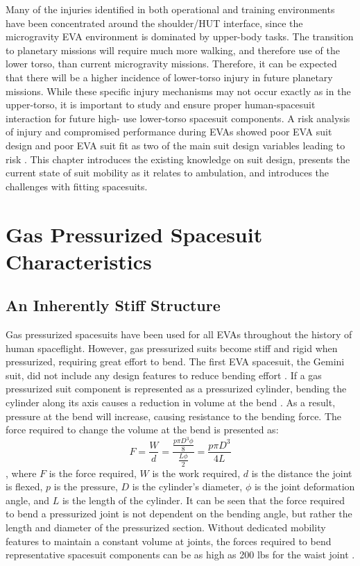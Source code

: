 \documentclass[defaultstyle,11pt]{comps}
\begin{document}
Many of the injuries identified in both operational and training environments have been concentrated around the shoulder/HUT interface, since the microgravity EVA environment is dominated by upper-body tasks.
The transition to planetary missions will require much more walking, and therefore use of the lower torso, than current microgravity missions.
Therefore, it can be expected that there will be a higher incidence of lower-torso injury in future planetary missions.
While these specific injury mechanisms may not occur exactly as in the upper-torso, it is important to study and ensure proper human-spacesuit interaction for future high- use lower-torso spacesuit components.
A risk analysis of injury and compromised performance during EVAs showed poor EVA suit design and poor EVA suit fit as two of the main suit design variables leading to risk \citep{Chappell2017}.
This chapter introduces the existing knowledge on suit design, presents the current state of suit mobility as it relates to ambulation, and introduces the challenges with fitting spacesuits.

\hypertarget{gas-pressurized-spacesuit-characteristics}{%
\section{Gas Pressurized Spacesuit Characteristics}\label{gas-pressurized-spacesuit-characteristics}}

\hypertarget{an-inherently-stiff-structure}{%
\subsection{An Inherently Stiff Structure}\label{an-inherently-stiff-structure}}

Gas pressurized spacesuits have been used for all EVAs throughout the history of human spaceflight.
However, gas pressurized suits become stiff and rigid when pressurized, requiring great effort to bend.
The first EVA spacesuit, the Gemini suit, did not include any design features to reduce bending effort \citep{Thomas2012}.
If a gas pressurized suit component is represented as a pressurized cylinder, bending the cylinder along its axis causes a reduction in volume at the bend \citep{Harris2001}.
As a result, pressure at the bend will increase, causing resistance to the bending force.
The force required to change the volume at the bend is presented as:
\[
F = \frac{W}{d} = \frac{\frac{p\pi D^{3}\phi}{8}}{\frac{L\phi}{2}} = \frac{p\pi D^{3}}{4L}
\]
\citep{Newman1997, Harris2001}, where \(F\) is the force required, \(W\) is the work required, \(d\) is the distance the joint is flexed, \(p\) is the pressure, \(D\) is the cylinder's diameter, \(\phi\) is the joint deformation angle, and \(L\) is the length of the cylinder.
It can be seen that the force required to bend a pressurized joint is not dependent on the bending angle, but rather the length and diameter of the pressurized section.
Without dedicated mobility features to maintain a constant volume at joints, the forces required to bend representative spacesuit components can be as high as 200 lbs for the waist joint \citep{Newman1997}.
\end{document}
